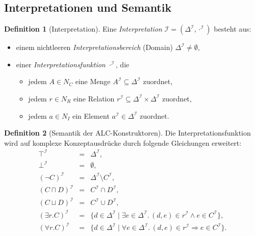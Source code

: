 ﻿\documentclass[a4paper,12pt]{article}
\theoremstyle{definition}
\newtheorem{definition}{Definition}[section]
\theoremstyle{plain}
\theoremstyle{remark}
\newcommand{\interp}[1]{\ensuremath{\mathcal{#1}}}
\newcommand{\Dom}[1]{\ensuremath{\Delta^{\interp{#1}}}}
\begin{document}
\subsection{Interpretationen und Semantik}

\begin{definition}[Interpretation]
\label{def:interpretation}
Eine \emph{Interpretation} $\interp{I} = (\Dom{I}, \cdot^\interp{I})$
besteht aus:
\begin{itemize}
  \item einem nichtleeren \emph{Interpretationsbereich}
        (Domain) $\Dom{I} \neq \emptyset$,
  \item einer \emph{Interpretationsfunktion} $\cdot^\interp{I}$, die
        \begin{itemize}
          \item jedem $A \in N_C$ eine Menge
                $A^\interp{I} \subseteq \Dom{I}$ zuordnet,
          \item jedem $r \in N_R$ eine Relation
                $r^\interp{I} \subseteq \Dom{I} \times \Dom{I}$
                zuordnet,
          \item jedem $a \in N_I$ ein Element
                $a^\interp{I} \in \Dom{I}$ zuordnet.
        \end{itemize}
\end{itemize}
\end{definition}

\begin{definition}[Semantik der ALC-Konstruktoren]
\label{def:alc-sem}
Die Interpretationsfunktion wird auf komplexe Konzeptausdr{\"{u}}cke durch
folgende Gleichungen erweitert:
\[
\renewcommand{\arraystretch}{1.5}
\begin{array}{rcl}
  \top^\interp{I} &=& \Dom{I}, \\
  \bot^\interp{I} &=& \emptyset, \\
  (\neg C)^\interp{I} &=& \Dom{I} \setminus C^\interp{I}, \\
  (C \sqcap D)^\interp{I} &=& C^\interp{I} \cap D^\interp{I}, \\
  (C \sqcup D)^\interp{I} &=& C^\interp{I} \cup D^\interp{I}, \\
  (\exists r.C)^\interp{I} &=&
    \{d \in \Dom{I} \mid
    \exists e \in \Dom{I}.\,(d,e) \in r^\interp{I} \wedge e \in C^\interp{I}\}, \\
  (\forall r.C)^\interp{I} &=&
    \{d \in \Dom{I} \mid
    \forall e \in \Dom{I}.\,(d,e) \in r^\interp{I} \Rightarrow e \in C^\interp{I}\}.
\end{array}
\]
\end{definition}
\end{document}
